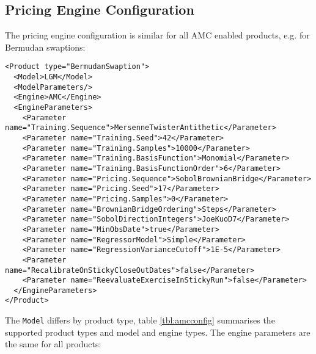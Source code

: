 \documentclass[12pt, a4paper]{article}
\begin{document}
\subsection{Pricing Engine Configuration}\label{sec:pricing_engine_config}

The pricing engine configuration is similar for all AMC enabled products, e.g. for Bermudan swaptions:

\begin{verbatim}
<Product type="BermudanSwaption">
  <Model>LGM</Model>
  <ModelParameters/>
  <Engine>AMC</Engine>
  <EngineParameters>
    <Parameter name="Training.Sequence">MersenneTwisterAntithetic</Parameter>
    <Parameter name="Training.Seed">42</Parameter>
    <Parameter name="Training.Samples">10000</Parameter>
    <Parameter name="Training.BasisFunction">Monomial</Parameter>
    <Parameter name="Training.BasisFunctionOrder">6</Parameter>
    <Parameter name="Pricing.Sequence">SobolBrownianBridge</Parameter>
    <Parameter name="Pricing.Seed">17</Parameter>
    <Parameter name="Pricing.Samples">0</Parameter>
    <Parameter name="BrownianBridgeOrdering">Steps</Parameter>
    <Parameter name="SobolDirectionIntegers">JoeKuoD7</Parameter>
    <Parameter name="MinObsDate">true</Parameter>
    <Parameter name="RegressorModel">Simple</Parameter>
    <Parameter name="RegressionVarianceCutoff">1E-5</Parameter>
    <Parameter name="RecalibrateOnStickyCloseOutDates">false</Parameter>
    <Parameter name="ReevaluateExerciseInStickyRun">false</Parameter>
  </EngineParameters>
</Product>
\end{verbatim}

The \verb+Model+ differs by product type, table \ref{tbl:amcconfig} summarises the supported product types and model and
engine types. The engine parameters are the same for all products:
\end{document}
